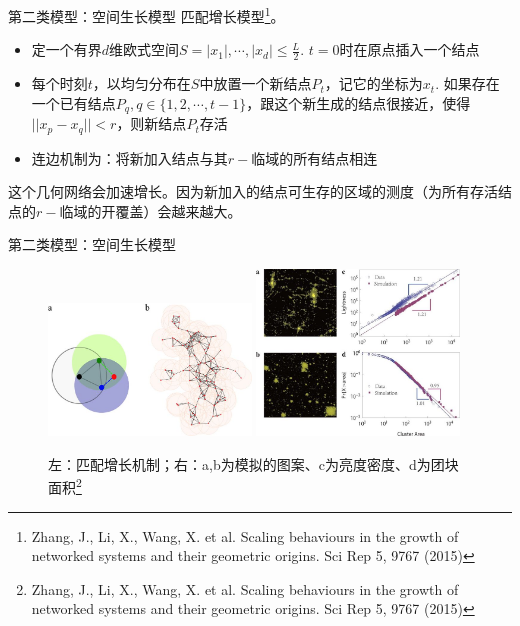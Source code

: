 \documentclass[utf8]{ctexbeamer}
\begin{document}
\begin{frame}{第二类模型：空间生长模型}
    匹配增长模型\footnote{Zhang, J., Li, X., Wang, X. et al. Scaling behaviours in the growth of networked systems and their geometric origins. Sci Rep 5, 9767 (2015)}。
    \begin{itemize}
        \item 定一个有界\(d\)维欧式空间\(S=|x_1|,\cdots,|x_d|\leq \frac{L}{2}.\) \(t=0\)时在原点插入一个结点
        \item 每个时刻\(t\)，以均匀分布在\(S\)中放置一个新结点\(P_t\)，记它的坐标为\(x_t.\) 如果存在一个已有结点\(P_q,q\in\{1,2,\cdots,t-1\}\)，跟这个新生成的结点很接近，使得\(||x_p-x_q||< r\)，则新结点\(P_t\)存活
        \item 连边机制为：将新加入结点与其\(r-\)临域的所有结点相连
    \end{itemize}
    \vspace{0.5cm}
    这个几何网络会加速增长。因为新加入的结点可生存的区域的测度（为所有存活结点的\(r-\)临域的开覆盖）会越来越大。
\end{frame}

\begin{frame}{第二类模型：空间生长模型}
    \begin{figure}
        \centering
        
        \includegraphics[width = 0.48\textwidth]{图片/srep09767-f1.jpg}
        \includegraphics[width = 0.48\textwidth]{图片/srep09767-f3.jpg}
        \caption{左：匹配增长机制；右：a,b为模拟的图案、c为亮度密度、d为团块面积\footnote{Zhang, J., Li, X., Wang, X. et al. Scaling behaviours in the growth of networked systems and their geometric origins. Sci Rep 5, 9767 (2015)}}
    \end{figure}
\end{frame}
\end{document}

